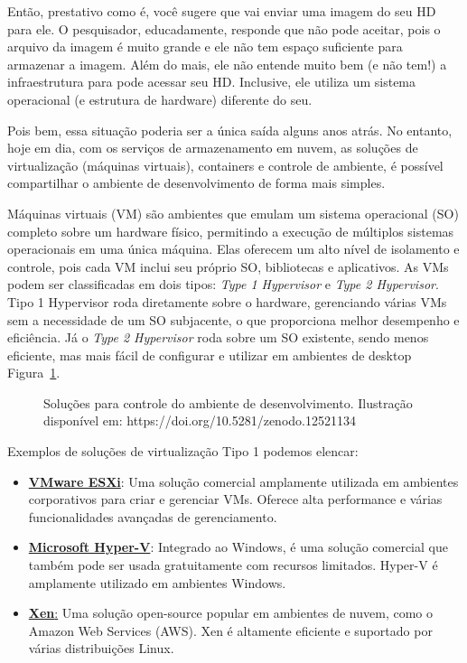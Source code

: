 \documentclass[
  a4paper,
]{book}
\begin{document}
Então, prestativo como é, você sugere que vai enviar uma imagem do seu
HD para ele. O pesquisador, educadamente, responde que não pode aceitar,
pois o arquivo da imagem é muito grande e ele não tem espaço suficiente
para armazenar a imagem. Além do mais, ele não entende muito bem (e não
tem!) a infraestrutura para pode acessar seu HD. Inclusive, ele utiliza
um sistema operacional (e estrutura de hardware) diferente do seu.

Pois bem, essa situação poderia ser a única saída alguns anos atrás. No
entanto, hoje em dia, com os serviços de armazenamento em nuvem, as
soluções de virtualização (máquinas virtuais), containers e controle de
ambiente, é possível compartilhar o ambiente de desenvolvimento de forma
mais simples.

Máquinas virtuais (VM) são ambientes que emulam um sistema operacional
(SO) completo sobre um hardware físico, permitindo a execução de
múltiplos sistemas operacionais em uma única máquina. Elas oferecem um
alto nível de isolamento e controle, pois cada VM inclui seu próprio SO,
bibliotecas e aplicativos. As VMs podem ser classificadas em dois tipos:
\emph{Type 1 Hypervisor} e \emph{Type 2 Hypervisor}. Tipo 1 Hypervisor
roda diretamente sobre o hardware, gerenciando várias VMs sem a
necessidade de um SO subjacente, o que proporciona melhor desempenho e
eficiência. Já o \emph{Type 2 Hypervisor} roda sobre um SO existente,
sendo menos eficiente, mas mais fácil de configurar e utilizar em
ambientes de desktop Figura~\ref{fig-vm-container}.

\begin{figure}


\caption{\label{fig-vm-container}Soluções para controle do ambiente de
desenvolvimento. Ilustração disponível em:
https://doi.org/10.5281/zenodo.12521134}

\end{figure}%

Exemplos de soluções de virtualização Tipo 1 podemos elencar:

\begin{itemize}
\item
  \href{https://www.vmware.com/products/esxi-and-esx.html.html}{\textbf{VMware
  ESXi}}: Uma solução comercial amplamente utilizada em ambientes
  corporativos para criar e gerenciar VMs. Oferece alta performance e
  várias funcionalidades avançadas de gerenciamento.
\item
  \href{https://learn.microsoft.com/pt-br/windows-server/virtualization/hyper-v/hyper-v-technology-overview}{\textbf{Microsoft
  Hyper-V}}: Integrado ao Windows, é uma solução comercial que também
  pode ser usada gratuitamente com recursos limitados. Hyper-V é
  amplamente utilizado em ambientes Windows.
\item
  \href{https://xenproject.org/}{\textbf{Xen}:} Uma solução open-source
  popular em ambientes de nuvem, como o Amazon Web Services (AWS). Xen é
  altamente eficiente e suportado por várias distribuições Linux.
\end{itemize}
\end{document}
